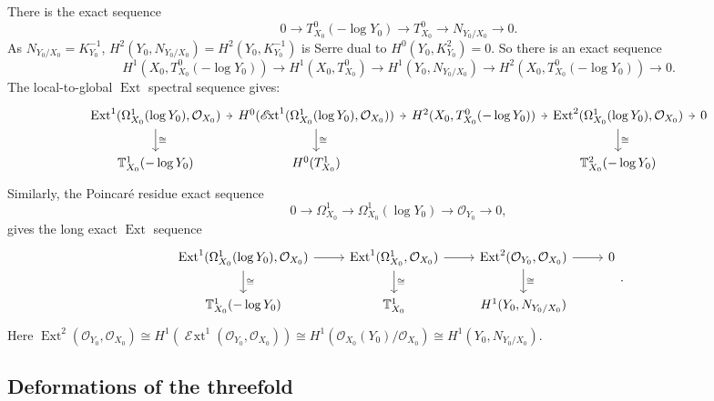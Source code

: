 \documentclass[10pt,a4paper]{amsart}
\newcommand{\OO}{\mathcal{O}}
\DeclareMathOperator{\sExt}{\mathscr{E}\!xt}
\DeclareMathOperator{\Ext}{Ext}
\begin{document}
There is the exact sequence
$$0\to T_{X_0}^0(-\log Y_0)\to T_{X_0}^0\to N_{Y_0/X_0}\to 0. $$
As $N_{Y_0/X_0}=K_{Y_0}^{-1}$, $H^2(Y_0, N_{Y_0/X_0})=H^2(Y_0, K_{Y_0}^{-1})$ is Serre dual to $H^0(Y_0, K_{Y_0}^2)=0$. 
So there is an exact sequence
\begin{equation}\label{eq:LEStanToNor}
  H^1(X_0, T_{X_0}^0(-\log Y_0))\to H^1(X_0, T_{X_0}^0)\to H^1(Y_0, N_{Y_0/X_0})\to H^2(X_0, T_{X_0}^0(-\log Y_0))\to 0. 
\end{equation}
The local-to-global $\Ext$ spectral sequence gives:
{\small 
\begin{equation} \label{eq:locToGlo} %
\begin{gathered}
\begin{tikzcd}[column sep=0.5em] %
\Ext^1(\Omega_{X_0}^1(\log Y_0), \OO_{X_0}) \ar[d, "\cong "] \ar[r] & H^0(\sExt^1(\Omega_{X_0}^1(\log Y_0), \OO_{X_0}))\ar[d, "\cong "] \ar[r]  & H^2(X_0, T_{X_0}^0(-\log Y_0)) \ar[r] & \Ext^2(\Omega_{X_0}^1(\log Y_0), \OO_{X_0}) \ar[r] \ar[d, "\cong"] & 0 \\
\mathbb{T}_{X_0}^1(-\log Y_0)  &  H^0(T_{X_0}^1) &      & \mathbb{T}_{X_0}^2(-\log Y_0) & 
\end{tikzcd}
\end{gathered}
\end{equation}
}
Similarly, the Poincaré residue exact sequence 
$$0\to \Omega_{X_0}^1\to \Omega_{X_0}^1(\log Y_0)\to \OO_{Y_0}\to 0, $$
gives the long exact $\Ext$ sequence
\begin{equation}\label{eq:DefPairToDef}
  \begin{tikzcd}
  \Ext^1(\Omega_{X_0}^1(\log Y_0),\OO_{X_0}) \ar[d, "\cong "] \ar[r] & \Ext^1(\Omega_{X_0}^1,\OO_{X_0}) \ar[d, "\cong"] \ar[r] & \Ext^2(\OO_{Y_0}, \OO_{X_0})\ar[d, "\cong"] \ar[r] & 0\\
  \mathbb{T}_{X_0}^1(-\log Y_0) & \mathbb{T}_{X_0}^1 & H^1(Y_0,N_{Y_0/X_0}) &
\end{tikzcd}.
\end{equation}
Here $\Ext^2(\OO_{Y_0}, \OO_{X_0})\cong H^1(\sExt^1(\OO_{Y_0}, \OO_{X_0}))\cong H^1(\OO_{X_0}(Y_0)/\OO_{X_0})\cong H^1(Y_0, N_{Y_0/X_0}).$
\subsection{Deformations of the threefold}
\end{document}
